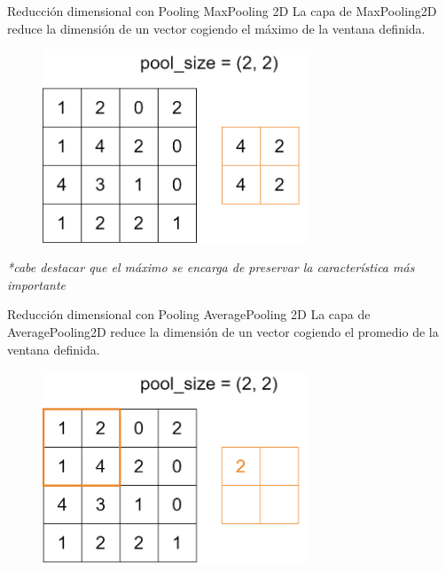 \begin{frame}{Reducción dimensional con Pooling}
\alert{\Large MaxPooling 2D}
La capa de MaxPooling2D reduce la dimensión de un vector cogiendo el \alert{máximo} de la ventana definida.

\begin{figure}
    \centering
    \includegraphics[width=0.7\textwidth]{figures/Tema 3/MaxPooling_res.png}
\end{figure}
\textit{*cabe destacar que el máximo se encarga de preservar la característica más importante}
\end{frame}

\begin{frame}{Reducción dimensional con Pooling}
\alert{\Large AveragePooling 2D}
La capa de AveragePooling2D reduce la dimensión de un vector cogiendo el \alert{promedio} de la ventana definida.

\begin{figure}
    \centering
    \includegraphics[width=0.7\textwidth]{figures/Tema 3/AvgPooling_1.png}
\end{figure}
\end{frame}

